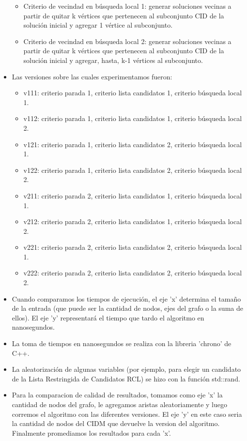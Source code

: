 \begin{itemize}
\begin{itemize}
        \item Criterio de vecindad en búsqueda local 1: generar soluciones vecinas a partir de quitar k vértices que pertenecen al subconjunto CID de la solución inicial y agregar 1 vértice al subconjunto.
        \item Criterio de vecindad en búsqueda local 2: generar soluciones vecinas a partir de quitar k vértices que pertenecen al subconjunto CID de la solución inicial y agregar, hasta, k-1 vértices al subconjunto.
    \end{itemize}
    \item Las versiones sobre las cuales experimentamos fueron:
    \begin{itemize}
        \item v111: criterio parada 1, criterio lista candidatos 1, criterio búsqueda local 1.
        \item v112: criterio parada 1, criterio lista candidatos 1, criterio búsqueda local 2.
        \item v121: criterio parada 1, criterio lista candidatos 2, criterio búsqueda local 1.
        \item v122: criterio parada 1, criterio lista candidatos 2, criterio búsqueda local 2.
        \item v211: criterio parada 2, criterio lista candidatos 1, criterio búsqueda local 1.
        \item v212: criterio parada 2, criterio lista candidatos 1, criterio búsqueda local 2.
        \item v221: criterio parada 2, criterio lista candidatos 2, criterio búsqueda local 1.
        \item v222: criterio parada 2, criterio lista candidatos 2, criterio búsqueda local 2.
    \end{itemize}
    \item Cuando comparamos los tiempos de ejecución, el eje 'x' determina el tamaño de la entrada (que puede ser la cantidad de nodos, ejes del grafo o la suma de ellos). El eje 'y' representará el tiempo que tardo el algoritmo en nanosegundos.
    \item La toma de tiempos en nanosegundos se realiza con la libreria 'chrono' de C++.
    \item La aleatorización de algunas variables (por ejemplo, para elegir un candidato de la Lista Restringida de Candidatos RCL) se hizo con la función std::rand.
    \item Para la comparacion de calidad de resultados, tomamos como eje 'x' la cantidad de nodos del grafo, le agregamos aristas aleatoriamente y luego corremos el algoritmo con las diferentes versiones. El eje 'y' en este caso seria la cantidad de nodos del CIDM que devuelve la version del algoritmo. Finalmente promediamos los resultados para cada 'x'.

\end{itemize}

